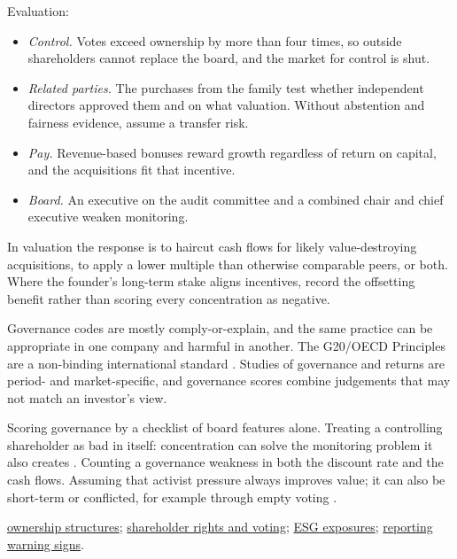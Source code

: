 \begin{qfmethod}
Evaluation:
\begin{itemize}
\item \emph{Control.} Votes exceed ownership by more than four times, so outside shareholders cannot replace the board, and the market for control is shut.
\item \emph{Related parties.} The purchases from the family test whether independent directors approved them and on what valuation. Without abstention and fairness evidence, assume a transfer risk.
\item \emph{Pay.} Revenue-based bonuses reward growth regardless of return on capital, and the acquisitions fit that incentive.
\item \emph{Board.} An executive on the audit committee and a combined chair and chief executive weaken monitoring.
\end{itemize}
In valuation the response is to haircut cash flows for likely value-destroying acquisitions, to apply a lower multiple than otherwise comparable peers, or both. Where the founder's long-term stake aligns incentives, record the offsetting benefit rather than scoring every concentration as negative.

 Governance codes are mostly comply-or-explain, and the same practice can be appropriate in one company and harmful in another. The G20/OECD Principles are a non-binding international standard \citep[pp.~15--21, 39--41]{oecd-g20-principles-2023}. Studies of governance and returns are period- and market-specific, and governance scores combine judgements that may not match an investor's view.

 Scoring governance by a checklist of board features alone. Treating a controlling shareholder as bad in itself: concentration can solve the monitoring problem it also creates \citep[principle~II.G, p.~20]{oecd-g20-principles-2023}. Counting a governance weakness in both the discount rate and the cash flows. Assuming that activist pressure always improves value; it can also be short-term or conflicted, for example through empty voting \citep[pp.~42--43]{applied-corporate-finance-2014}.

 \hyperref[def:global-ownership-structures]{ownership structures}; \hyperref[def:equity-rights-voting]{shareholder rights and voting}; \hyperref[meth:esg-exposure-evaluation]{ESG exposures}; \hyperref[meth:reporting-warning-signs]{reporting warning signs}.

\end{qfmethod}

